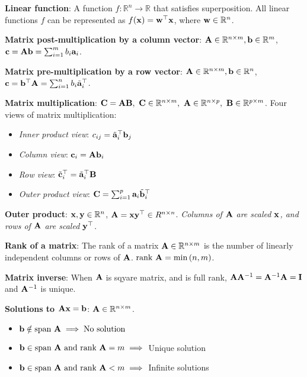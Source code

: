 \documentclass[letterpaper, twocolumn, 11pt]{article}
\newcommand{\R}{\mathbb{R}}	%
\newcommand{\1}{\mathds{1}}	%
\theoremstyle{definition}
\def\mf{\ensuremath\mathbf}
\def\lp{\ensuremath\left(}
\def\rp{\ensuremath\right)}
\begin{document}
\textbf{Linear function}: A function $f: \R^n \to \R$ that satisfies superposition. All linear functions $f$ can be represented as $f(\mf{x}) = \mf{w}^\top \mf{x}$, where $\mf{w} \in \R^n$.

\textbf{Matrix post-multiplication by a column vector}: $\mf{A} \in \R^{n \times m}, \mf{b} \in \R^m$, $\mf{c} = \mf{A}\mf{b} = \sum_{i=1}^m b_i \mf{a}_i$.

\textbf{Matrix pre-multiplication by a row vector}: $\mf{A} \in \R^{n \times m}, \mf{b} \in \R^n$, $\mf{c} = \mf{b}^\top\mf{A} = \sum_{i=1}^n b_i \tilde{\mf{a}}_i^\top$.

\textbf{Matrix multiplication}: $\mf{C} = \mf{A}\mf{B}, \,\, \mf{C} \in \R^{n \times m}, \,\, \mf{A} \in \R^{n \times p}, \,\, \mf{B} \in \R^{p \times m}$. Four views of matrix multiplication: 
\vspace{-2.5em}

\begin{itemize}
  \item \textit{Inner product view}: $c_{ij} = \tilde{\mf{a}}_i^\top\mf{b}_j$ \vspace{-0.75em}
  \item \textit{Column view}: $\mf{c}_{i} = \mf{A}\mf{b}_i$  \vspace{-0.75em}
  \item \textit{Row view}: $\tilde{\mf{c}}_{i}^\top = \tilde{\mf{a}}_i^\top\mf{B}$  \vspace{-0.75em}
  \item \textit{Outer product view}: $\mf{C} = \sum_{i=1}^p \mf{a}_i\tilde{\mf{b}}_i^\top$ \vspace{-0.75em}
\end{itemize}

\textbf{Outer product}: $\mf{x}, \mf{y} \in \R^{n}$, $\mf{A} = \mf{x}\mf{y}^\top \in R^{n \times n}$. \textit{Columns of $\mf{A}$ are scaled $\mf{x}$, and rows of $\mf{A}$ are scaled $\mf{y}^\top$.}

\textbf{Rank of a matrix}: The rank of a matrix $\mf{A} \in \R^{n \times m}$ is the number of linearly independent columns or rows of $\mf{A}$. $\text{rank } \mf{A} = \min \lp n, m\rp$.

\textbf{Matrix inverse}: When $\mf{A}$ is sqyare matrix, and is full rank, $\mf{A}\mf{A}^{-1} = \mf{A}^{-1}\mf{A} = \mf{I}$ and $\mf{A}^{-1}$ is unique.

\textbf{Solutions to $\mf{A}\mf{x} = \mf{b}$}: $\mf{A} \in \R^{n \times m}$. \vspace{-1.25em}
\begin{itemize}
  \item $\mf{b} \notin \text{span }\mf{A} \implies \text{No solution}$ \vspace{-0.75em}
  \item $\mf{b} \in \text{span }\mf{A} \text{ and } \text{rank }\mf{A} = m \implies$ Unique solution \vspace{-0.75em}
  \item $\mf{b} \in \text{span }\mf{A} \text{ and } \text{rank }\mf{A} < m \implies$ Infinite solutions \vspace{-0.75em}
\end{itemize}
\end{document}
